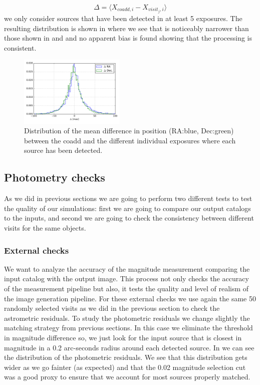 \documentclass[\docopts]{\docclass}
\begin{document}
\begin{equation}
  \Delta = \langle X_{coadd,i} - X_{visit_{j},i} \rangle
\end{equation}
we only consider sources that have been detected in at least 5 exposures. The resulting distribution is shown in 
where we see that is noticeably narrower than those shown in  and  and no apparent bias is found showing
that the processing is consistent.

\begin{figure}
  \centering
  \includegraphics[width=0.45\textwidth]{astrometry_internal_10visits_imsim_undithered}
  \caption{Distribution of the mean difference in position (RA:blue, Dec:green) between the coadd and the different individual exposures
  where each source has been detected.}
  \label{fig:astrometry_internal}
\end{figure}

\subsection{Photometry checks}
\label{sec:photometry_checks}

As we did in previous sections we are going to perform two different tests to test the quality of our simulations: first we are going to
compare our output catalogs to the inputs, and second we are going to check the consistency between different visits for the same objects.

\subsubsection{External checks}
\label{sec:external_photometry}

We want to analyze the accuracy of the magnitude measurement comparing the input catalog with the output image. This process not only checks
the accuracy of the measurement pipeline but also, it tests the quality and level of realism of the image generation pipeline.
For these external checks we use again the same 50 randomly selected visits as we did in the previous section to check the astrometric residuals.
To study the photometric residuals we change slightly the matching strategy from previous sections. In this case we eliminate the threshold
in magnitude difference so, we just look for the input source that is closest in magnitude in a 0.2 arc-seconds radius around each detected
source. In  we can see the distribution of the photometric residuals. We see that this distribution gets wider as we go
fainter (as expected) and that the 0.02 magnitude selection cut was a good proxy to ensure that we account for most sources properly matched.
\end{document}
